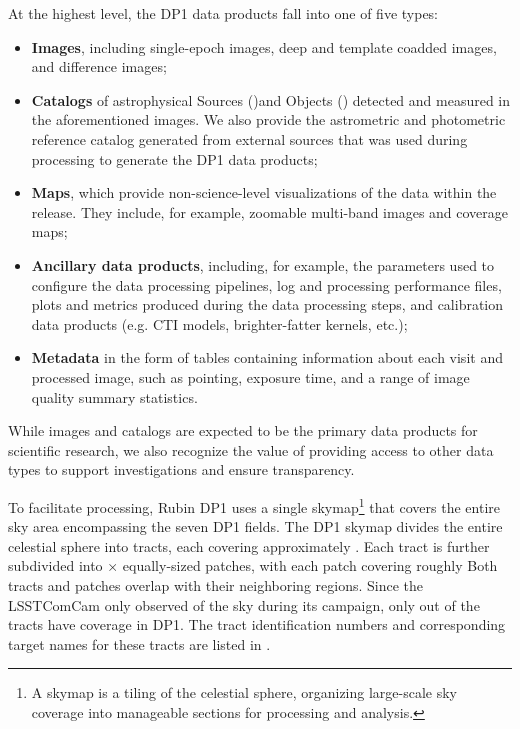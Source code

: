 At the highest level, the \gls{DP1} data products fall into one of five types:
\begin{itemize}
\item \textbf{Images}, including single-\gls{epoch} images, deep and template coadded images, and difference images;
\item \textbf{Catalogs} of astrophysical Sources (\secref{})and Objects (\secref{}) detected and measured in the aforementioned images. We also provide the astrometric and photometric reference catalog generated from external sources that was used during processing to generate the \gls{DP1} data products;
\item \textbf{Maps}, which provide non-science-level visualizations of the data within the release. They include, for example, zoomable multi-band images and coverage maps;
\item \textbf{Ancillary data products}, including, for example, the parameters used to configure the data processing pipelines, log and processing performance files, plots and metrics produced during the data processing steps, and \gls{calibration} data products (e.g. \gls{CTI} models, brighter-fatter kernels, etc.);
\item \textbf{Metadata} in the form of tables containing information about each visit and processed image, such as pointing, exposure time, and a range of image quality summary statistics.
\end{itemize}
While images and catalogs are expected to be the primary data products for scientific research, we also recognize the value of providing access to other data types to support investigations and ensure transparency.

To facilitate processing, Rubin \gls{DP1} uses a single skymap\footnote{A skymap is a tiling of the celestial sphere, organizing large-scale sky coverage into manageable sections for processing and analysis.} that covers the entire sky area encompassing the seven \gls{DP1} fields.
The \gls{DP1} skymap divides the entire celestial sphere into \ntotaltracts tracts, each covering approximately \tractarea.
Each \gls{tract} is further subdivided into \npatchx × \npatchy equally-sized patches, with each \gls{patch} covering roughly \innerpatcharea
Both tracts and patches overlap with their neighboring regions.
Since the \gls{LSSTComCam} only observed \totalarea of the sky during its campaign, only \ncoveredtracts out of the \ntotaltracts tracts have coverage in \gls{DP1}.
The \gls{tract} identification numbers and corresponding target names for these tracts are listed in .


